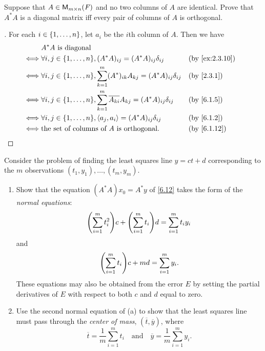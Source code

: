 \begin{ex}\label{ex:6.3.19}
  Suppose that \(A \in \mathsf{M}_{{m} \times n}({\mathit{F}})\) and no two columns of \(A\) are identical.
  Prove that \(A^* A\) is a diagonal matrix iff every pair of columns of \(A\) is orthogonal.
\end{ex}

\begin{proof}[]
  For each \(i \in \left\lbrace1, \dots, n\right\rbrace\), let \(a_i\) be the \(i\)th column of \(A\).
  Then we have
  \begin{align*}
         & A^* A \text{ is diagonal}                                                                                                                \\
    \iff & \forall i, j \in \set{1, \dots, n}, (A^* A)_{i j} = (A^* A)_{i j} \delta_{i j}                         &  & \text{(by \cref{ex:2.3.10})} \\
    \iff & \forall i, j \in \set{1, \dots, n}, \sum_{k = 1}^m (A^*)_{i k} A_{k j} = (A^* A)_{i j} \delta_{i j}    &  & \text{(by \cref{2.3.1})}     \\
    \iff & \forall i, j \in \set{1, \dots, n}, \sum_{k = 1}^m \conj{A_{k i}} A_{k j} = (A^* A)_{i j} \delta_{i j} &  & \text{(by \cref{6.1.5})}     \\
    \iff & \forall i, j \in \set{1, \dots, n}, \inn{a_j, a_i} = (A^* A)_{i j} \delta_{i j}                        &  & \text{(by \cref{6.1.2})}     \\
    \iff & \text{the set of columns of } A \text{ is orthogonal}.                                                 &  & \text{(by \cref{6.1.12})}
  \end{align*}
\end{proof}

\setcounter{ex}{22}
\begin{ex}\label{ex:6.3.23}
  Consider the problem of finding the least squares line \(y = ct + d\) corresponding to the \(m\) observations \((t_1, y_1), \dots, (t_m, y_m)\).
  \begin{enumerate}
    \item Show that the equation \((A^* A) x_0 = A^* y\) of \cref{6.12} takes the form of the \emph{normal equations}:
          \[
            \pa{\sum_{i = 1}^m t_i^2} c + \pa{\sum_{i = 1}^m t_i} d = \sum_{i = 1}^m t_i y_i
          \]
          and
          \[
            \pa{\sum_{i = 1}^m t_i} c + md = \sum_{i = 1}^m y_i.
          \]
          These equations may also be obtained from the error \(E\) by setting the partial derivatives of \(E\) with respect to both \(c\) and \(d\) equal to zero.
    \item Use the second normal equation of (a) to show that the least squares line must pass through the \emph{center of mass}, \((\overline{t}, \overline{y})\), where
          \[
            \overline{t} = \frac{1}{m} \sum_{i = 1}^m t_i \quad \text{and} \quad \overline{y} = \frac{1}{m} \sum_{i = 1}^m y_i.
          \]
  \end{enumerate}
\end{ex}

